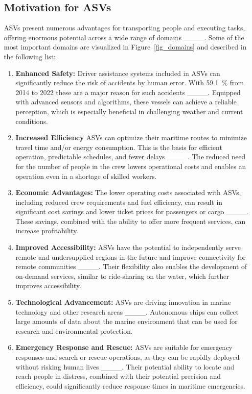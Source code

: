 \subsection{Motivation for ASVs}
ASVs present numerous advantages for transporting people and executing tasks, offering enormous potential across a wide range of domains ____. Some of the most important domains are visualized in Figure~\ref{fig_domains} and described in the following list:
\begin{enumerate}
    \item \textbf{Enhanced Safety:}
    Driver assistance systems included in ASVs can significantly reduce the risk of accidents by human error. With 59.1~\% from 2014 to 2022 these are a major reason for such accidents ____. Equipped with advanced sensors and algorithms, these vessels can achieve a reliable perception, which is especially beneficial in challenging weather and current conditions.
    \item \textbf{Increased Efficiency}
    ASVs can optimize their maritime routes to minimize travel time and/or energy consumption. This is the basis for efficient operation, predictable schedules, and fewer delays ____. The reduced need for the number of people in the crew lowers operational costs and enables an operation even in a shortage of skilled workers.
    \item \textbf{Economic Advantages:}
     The lower operating costs associated with ASVs, including reduced crew requirements and fuel efficiency, can result in significant cost savings and lower ticket prices for passengers or cargo ____. These savings, combined with the ability to offer more frequent services, can increase profitability.
    \item \textbf{Improved Accessibility:}
    ASVs have the potential to independently serve remote and undersupplied regions in the future and improve connectivity for remote communities ____. Their flexibility also enables the development of on-demand services, similar to ride-sharing on the water, which further improves accessibility.
    \item \textbf{Technological Advancement:}
     ASVs are driving innovation in marine technology and other research areas ____. Autonomous ships can collect large amounts of data about the marine environment that can be used for research and environmental protection. 
    \item \textbf{Emergency Response and Rescue:}
   ASVs are suitable for emergency responses and search or rescue operations,  as they can be rapidly deployed without risking human lives ____. Their potential ability to locate and reach people in distress, combined with their potential precision and efficiency, could significantly reduce response times in maritime emergencies.
\end{enumerate}
